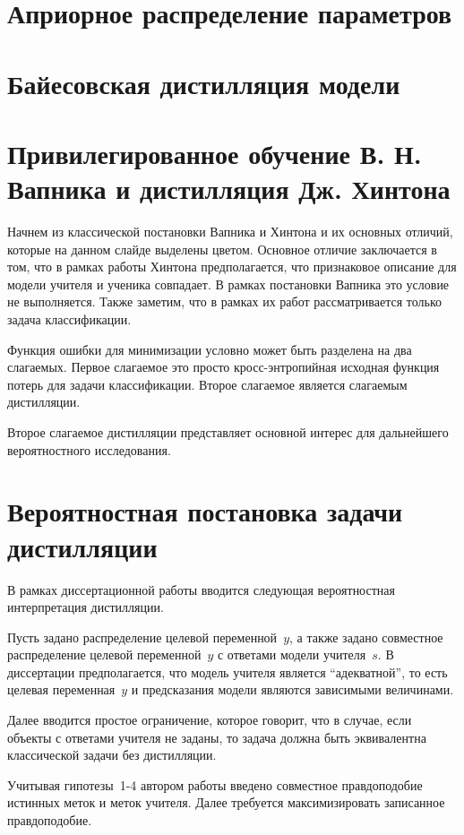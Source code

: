 \documentclass[12pt, twoside]{article}
\begin{document}
\section{Априорное распределение параметров}
\section{Байесовская дистилляция модели}
\section{Привилегированное обучение В. Н. Вапника и дистилляция Дж. Хинтона}
Начнем из классической постановки Вапника и Хинтона и их основных отличий, которые на данном слайде выделены цветом. Основное отличие заключается в том, что в рамках работы Хинтона предполагается, что признаковое описание для модели учителя и ученика совпадает. В рамках постановки Вапника это условие не выполняется. Также заметим, что в рамках их работ рассматривается только задача классификации.

Функция ошибки для минимизации условно может быть разделена на два слагаемых. Первое слагаемое это просто кросс-энтропийная исходная функция потерь для задачи классификации. Второе слагаемое является слагаемым дистилляции.

Второе слагаемое дистилляции представляет основной интерес для дальнейшего вероятностного исследования.

\section{Вероятностная постановка задачи дистилляции}
В рамках диссертационной работы вводится следующая вероятностная интерпретация дистилляции.

Пусть задано распределение целевой переменной~$y$, а также задано совместное распределение целевой переменной~$y$ с ответами модели учителя~$s$. В диссертации предполагается, что модель учителя является ``адекватной'', то есть целевая переменная~$y$ и предсказания модели являются зависимыми величинами. 

Далее вводится простое ограничение, которое говорит, что в случае, если объекты с ответами учителя не заданы, то задача должна быть эквивалентна классической задачи без дистилляции.

Учитывая гипотезы~1-4 автором работы введено совместное правдоподобие истинных меток и меток учителя. Далее требуется максимизировать записанное правдоподобие. 
\end{document}
